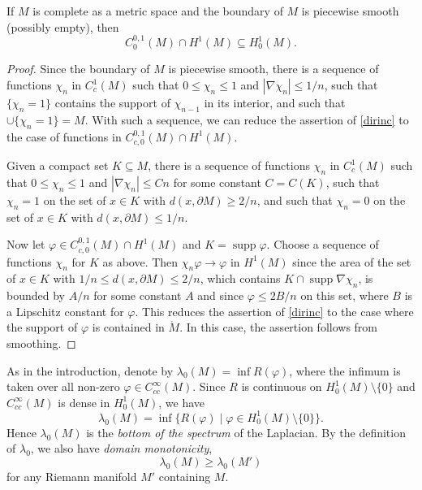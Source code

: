 \begin{lem}\label{dirinc}
If $M$ is complete as a metric space and the boundary of $M$ is piecewise smooth
(possibly empty), then
\begin{equation*}
  C^{0,1}_{0}(M) \cap H^1(M) \subseteq H^1_0(M).
\end{equation*}
\end{lem}

\begin{proof}
Since the boundary of $M$ is piecewise smooth,
there is a sequence of functions $\chi_n$ in $C^1_c(M)$
such that $0\le\chi_n\le1$ and $|\nabla\chi_n|\le1/n$,
such that $\{\chi_n=1\}$ contains the support of $\chi_{n-1}$ in its interior,
and such that $\cup\{\chi_n=1\}=M$.
With such a sequence, we can reduce the assertion of \cref{dirinc}
to the case of functions in $C^{0,1}_{c,0}(M) \cap H^1(M)$. 

Given a compact set $K\subseteq M$,
there is a sequence of functions $\chi_n$ in $C^1_c(M)$
such that $0\le\chi_n\le1$ and $|\nabla\chi_n|\le Cn$ for some constant $C=C(K)$,
such that $\chi_n=1$ on the set of $x\in K$ with $d(x,\partial M)\ge2/n$,
and such that $\chi_n=0$ on the set of $x\in K$ with $d(x,\partial M)\le1/n$.

Now let ${\varphi}\in C^{0,1}_{c,0}(M) \cap H^1(M)$ and $K={\operatorname{supp}}{\varphi}$.
Choose a sequence of functions $\chi_n$ for $K$ as above.
Then $\chi_n{\varphi}\to{\varphi}$ in $H^1(M)$ since the area of the set of $x\in K$
with $1/n\le d(x,\partial M)\le2/n$, which contains $K\cap{\operatorname{supp}}\nabla\chi_n$,
is bounded by $A/n$ for some constant $A$
and since ${\varphi}\le2B/n$ on this set, where $B$ is a Lipschitz constant for ${\varphi}$.
This reduces the assertion of \cref{dirinc} to the case where the support of ${\varphi}$
is contained in $\mathring M$.
In this case, the assertion follows from smoothing.
\end{proof}

As in the introduction, denote by $\lambda_0(M)=\inf R({\varphi})$,
where the infimum is taken over all non-zero ${\varphi}\in C^\infty_{cc}(M)$.
Since $R$ is continuous on $H^1_0(M)\setminus\{0\}$
and $C^\infty_{cc}(M)$ is dense in $H^1_0(M)$, we have
\begin{equation}\label{rayl1}
  \lambda_0(M) = \inf \{ R({\varphi}) \mid {\varphi}\in H^1_0(M)\setminus\{0\} \}. 
\end{equation}
Hence $\lambda_0(M)$ is the \emph{bottom of the spectrum} of the Laplacian.
By the definition of $\lambda_0$, we also have \emph{domain monotonicity},
\begin{equation}\label{raylm}
  \lambda_0(M) \ge \lambda_0(M')
\end{equation}
for any Riemann manifold $M'$ containing $M$.


